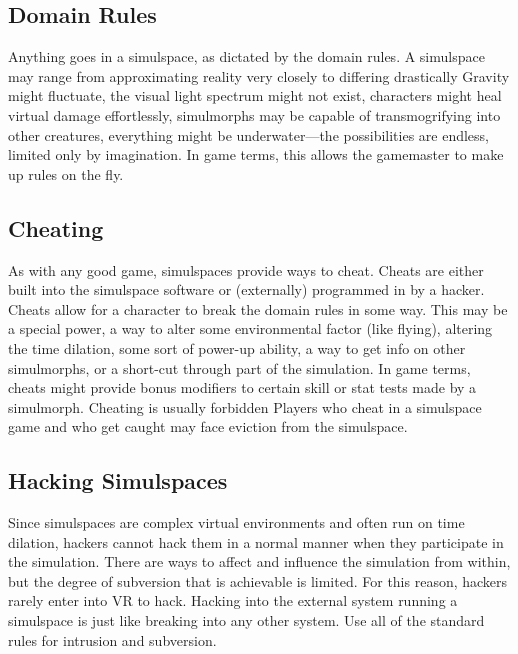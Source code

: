 \subsection{Domain Rules} 

Anything goes in a simulspace, as dictated by the domain rules. A simulspace may range from approximating reality very closely to differing drastically Gravity might fluctuate, the visual light spectrum might not exist, characters might heal virtual damage effortlessly, simulmorphs may be capable of transmogrifying into other creatures, everything might be underwater—the possibilities are endless, limited only by imagination. In game terms, this allows the gamemaster to make up rules on the fly. 

\subsection{Cheating} 

As with any good game, simulspaces provide ways to cheat. Cheats are either built into the simulspace software or (externally) programmed in by a hacker. Cheats allow for a character to break the domain rules in some way. This may be a special power, a way to alter some environmental factor (like flying), altering the time dilation, some sort of power-up ability, a way to get info on other simulmorphs, or a short-cut through part of the simulation. In game terms, cheats might provide bonus modifiers to certain skill or stat tests made by a simulmorph. Cheating is usually forbidden Players who cheat in a simulspace game and who get caught may face eviction from the simulspace. 

\subsection{Hacking Simulspaces} 

Since simulspaces are complex virtual environments and often run on time dilation, hackers cannot hack them in a normal manner when they participate in the simulation. There are ways to affect and influence the simulation from within, but the degree of subversion that is achievable is limited. For this reason, hackers rarely enter into VR to hack. Hacking into the external system running a simulspace is just like breaking into any other system. Use all of the standard rules for intrusion and subversion. 

